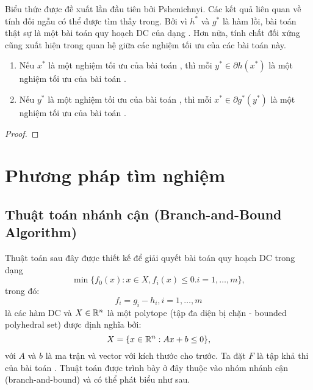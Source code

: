 \documentclass[a4paper]{report}
\begin{document}
    Biểu thức  được đề xuất lần đầu tiên bởi Pshenichnyi. Các kết quả liên quan về tính đối ngẫu có thể được tìm thấy trong. Bởi vì $h^*$ và $g^*$ là hàm lồi, bài toán  thật sự là một bài toán quy hoạch DC của dạng . Hơn nữa, tính chất đối xứng cũng xuất hiện trong quan hệ giữa các nghiệm tối ưu của các bài toán này.

    \begin{proposition}
        \begin{enumerate}[label=(\roman*)]
            \item Nếu $x^*$ là một nghiệm tối ưu của bài toán , thì mỗi $y^* \in \partial h(x^*)$ là một nghiệm tối ưu của bài toán .
            \item Nếu $y^*$ là một nghiệm tối ưu của bài toán , thì mỗi $x^* \in \partial g^*(y^*)$ là một nghiệm tối ưu của bài toán .
        \end{enumerate}
    \end{proposition}

    \begin{proof}
        
    \end{proof}


    \chapter{Phương pháp tìm nghiệm}
    \label{chap:solution_methods}

    \section{Thuật toán nhánh cận (Branch-and-Bound Algorithm)}
    \label{sec:branch_bound_algorithm}
    Thuật toán sau đây được thiết kế để giải quyết bài toán quy hoạch DC trong dạng 
    \begin{equation}
        \label{eq:dc_programming_bab}
        \min\{f_0(x): x \in X, f_i(x) \leq 0. i = 1,\dots, m\},
    \end{equation}
    trong đó:
    \begin{equation}
        f_i = g_i - h_i, i = 1,\dots, m
    \end{equation}
    là các hàm DC và $X \in \mathbb{R}^n$ là một polytope (tập đa diện bị chặn - bounded polyhedral set) được định nghĩa bởi:
    \begin{equation}
        \label{eq:polytope}
        X = \{x \in \mathbb{R}^n: Ax + b \leq 0\},
    \end{equation}
    với $A$ và $b$ là ma trận và vector với kích thước cho trước. Ta đặt $F$ là tập khả thi của bài toán . Thuật toán được trình bày ở đây thuộc vào nhóm nhánh cận (branch-and-bound) và có thể phát biểu như sau.
\end{document}
